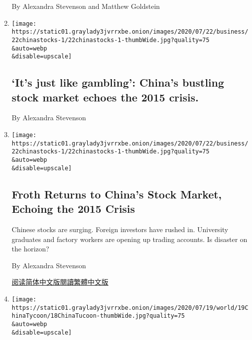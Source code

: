 \begin{enumerate}
  By Alexandra Stevenson and Matthew Goldstein
\item
  \href{/2020/07/22/business/its-just-like-gambling-chinas-bustling-stock-market-echoes-the-2015-crisis.html}{}

  \texttt{[image: https://static01.graylady3jvrrxbe.onion/images/2020/07/22/business/22chinastocks-1/22chinastocks-1-thumbWide.jpg?quality=75\\\&auto=webp\\\&disable=upscale]}

  \hypertarget{its-just-like-gambling-chinas-bustling-stock-market-echoes-the-2015-crisis}{%
  \subsection{`It's just like gambling': China's bustling stock market
  echoes the 2015
  crisis.}\label{its-just-like-gambling-chinas-bustling-stock-market-echoes-the-2015-crisis}}

  By Alexandra Stevenson
\item
  \href{/2020/07/22/business/china-stock-market.html}{}

  \texttt{[image: https://static01.graylady3jvrrxbe.onion/images/2020/07/22/business/22chinastocks-1/22chinastocks-1-thumbWide.jpg?quality=75\\\&auto=webp\\\&disable=upscale]}

  \hypertarget{froth-returns-to-chinas-stock-market-echoing-the-2015-crisis}{%
  \subsection{Froth Returns to China's Stock Market, Echoing the 2015
  Crisis}\label{froth-returns-to-chinas-stock-market-echoing-the-2015-crisis}}

  Chinese stocks are surging. Foreign investors have rushed in.
  University graduates and factory workers are opening up trading
  accounts. Is disaster on the horizon?

  By Alexandra Stevenson

  \href{https://cn.nytimes3xbfgragh.onion/business/20200724/china-stock-market/}{阅读简体中文版}\href{https://cn.nytimes3xbfgragh.onion/business/20200724/china-stock-market/zh-hant/}{閱讀繁體中文版}
\item
  \href{/2020/07/18/business/china-xiao-jianhua.html}{}

  \texttt{[image: https://static01.graylady3jvrrxbe.onion/images/2020/07/19/world/19ChinaTycoon/18ChinaTucoon-thumbWide.jpg?quality=75\\\&auto=webp\\\&disable=upscale]}

  \hypertarget{china-is-dismantling-the-empire-of-a-vanished-tycoon}{%
}
\end{enumerate}
